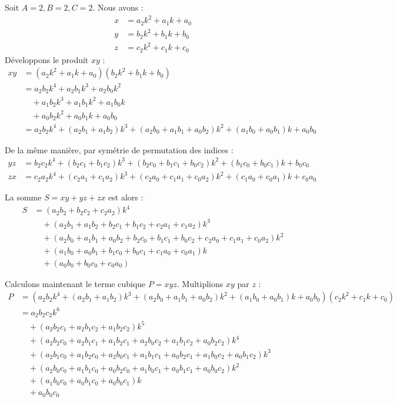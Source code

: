 \documentclass[11pt,a4paper]{article}
\begin{document}
Soit $A=2, B=2, C=2$. Nous avons :
\begin{align*}
x &= a_2 k^2 + a_1 k + a_0 \\
y &= b_2 k^2 + b_1 k + b_0 \\
z &= c_2 k^2 + c_1 k + c_0
\end{align*}
Développons le produit $xy$ :
\begin{align*}
xy &= (a_2 k^2 + a_1 k + a_0)(b_2 k^2 + b_1 k + b_0) \\
&= a_2 b_2 k^4 + a_2 b_1 k^3 + a_2 b_0 k^2 \\
&\quad + a_1 b_2 k^3 + a_1 b_1 k^2 + a_1 b_0 k \\
&\quad + a_0 b_2 k^2 + a_0 b_1 k + a_0 b_0 \\
&= a_2 b_2 k^4 + (a_2 b_1 + a_1 b_2) k^3 + (a_2 b_0 + a_1 b_1 + a_0 b_2) k^2 + (a_1 b_0 + a_0 b_1) k + a_0 b_0
\end{align*}

De la même manière, par symétrie de permutation des indices :
\begin{align*}
yz &= b_2 c_2 k^4 + (b_2 c_1 + b_1 c_2) k^3 + (b_2 c_0 + b_1 c_1 + b_0 c_2) k^2 + (b_1 c_0 + b_0 c_1) k + b_0 c_0 \\
zx &= c_2 a_2 k^4 + (c_2 a_1 + c_1 a_2) k^3 + (c_2 a_0 + c_1 a_1 + c_0 a_2) k^2 + (c_1 a_0 + c_0 a_1) k + c_0 a_0
\end{align*}

La somme $S = xy + yz + zx$ est alors :
\begin{align*}
S &= (a_2 b_2 + b_2 c_2 + c_2 a_2) k^4 \\
&\quad + (a_2 b_1 + a_1 b_2 + b_2 c_1 + b_1 c_2 + c_2 a_1 + c_1 a_2) k^3 \\
&\quad + (a_2 b_0 + a_1 b_1 + a_0 b_2 + b_2 c_0 + b_1 c_1 + b_0 c_2 + c_2 a_0 + c_1 a_1 + c_0 a_2) k^2 \\
&\quad + (a_1 b_0 + a_0 b_1 + b_1 c_0 + b_0 c_1 + c_1 a_0 + c_0 a_1) k \\
&\quad + (a_0 b_0 + b_0 c_0 + c_0 a_0)
\end{align*}

Calculons maintenant le terme cubique $P = xyz$. Multiplions $xy$ par $z$ :
\begin{align*}
P &= \left( a_2 b_2 k^4 + (a_2 b_1 + a_1 b_2) k^3 + (a_2 b_0 + a_1 b_1 + a_0 b_2) k^2 + (a_1 b_0 + a_0 b_1) k + a_0 b_0 \right) (c_2 k^2 + c_1 k + c_0) \\
&= a_2 b_2 c_2 k^6 \\
&\quad + (a_2 b_2 c_1 + a_2 b_1 c_2 + a_1 b_2 c_2) k^5 \\
&\quad + (a_2 b_2 c_0 + a_2 b_1 c_1 + a_1 b_2 c_1 + a_2 b_0 c_2 + a_1 b_1 c_2 + a_0 b_2 c_2) k^4 \\
&\quad + (a_2 b_1 c_0 + a_1 b_2 c_0 + a_2 b_0 c_1 + a_1 b_1 c_1 + a_0 b_2 c_1 + a_1 b_0 c_2 + a_0 b_1 c_2) k^3 \\
&\quad + (a_2 b_0 c_0 + a_1 b_1 c_0 + a_0 b_2 c_0 + a_1 b_0 c_1 + a_0 b_1 c_1 + a_0 b_0 c_2) k^2 \\
&\quad + (a_1 b_0 c_0 + a_0 b_1 c_0 + a_0 b_0 c_1) k \\
&\quad + a_0 b_0 c_0
\end{align*}
\end{document}
